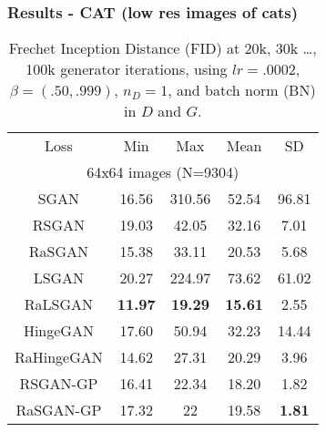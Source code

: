 \documentclass[t]{beamer}
\begin{document}

\begin{frame}
	\frametitle{Results - CAT (low res images of cats)}
	
\small \begin{table}
	\caption{Frechet Inception Distance (FID) at 20k, 30k \ldots , 100k generator iterations, using $lr=.0002$, $\beta=(.50,.999)$, $n_D=1$, and batch norm (BN) in $D$ and $G$.}
	\centering
	\begin{tabular}{ccccc}
		\toprule
		Loss & Min & Max & Mean & SD \\
		\cmidrule{1-5}
		\multicolumn{5}{c}{64x64 images (N=9304)} \\
		SGAN & 16.56 & 310.56 & 52.54 & 96.81 \\
		RSGAN & 19.03 & 42.05 & 32.16 & 7.01 \\
		RaSGAN & 15.38 & 33.11 & 20.53 & 5.68 \\
		\cmidrule{1-5}
		LSGAN & 20.27 & 224.97 & 73.62 & 61.02 \\
		RaLSGAN & \textbf{11.97} & \textbf{19.29} & \textbf{15.61} & 2.55 \\
		\cmidrule{1-5}
		HingeGAN & 17.60 & 50.94 & 32.23 & 14.44 \\
		RaHingeGAN & 14.62 & 27.31 & 20.29 & 3.96 \\
		\cmidrule{1-5}
		RSGAN-GP & 16.41 & 22.34 & 18.20 & 1.82 \\
		RaSGAN-GP & 17.32 & 22 & 19.58 & \textbf{1.81} \\
	\end{tabular}
\end{table}
	
\end{frame}

\end{document}
